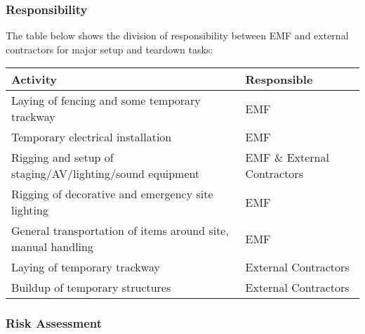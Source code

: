 \subsubsection{Responsibility}
The table below shows the division of responsibility between EMF and external contractors
for major setup and teardown tasks:

\begin{table}[h!]
\begin{tabular}{| p{10cm} | l |}
\hline
\textbf{Activity} & \textbf{Responsible} \\ \hline
Laying of fencing and some temporary trackway & EMF \\
Temporary electrical installation & EMF \\
Rigging and setup of staging/AV/lighting/sound equipment & EMF \& External Contractors \\
Rigging of decorative and emergency site lighting & EMF \\
General transportation of items around site, manual handling & EMF \\
Laying of temporary trackway & External Contractors \\
Buildup of temporary structures & External Contractors \\
\hline
\end{tabular}
\end{table}

\subsubsection{Risk Assessment}

